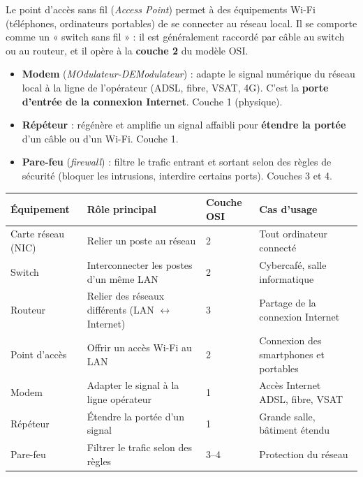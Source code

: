\documentclass[11pt]{article}
\newcommand{\cle}[1]{{\popxbold\color{popdark}#1}}
\begin{document}
\begin{definition}
Le \cle{point d'accès sans fil} (\emph{Access Point}) permet à des équipements Wi-Fi (téléphones, ordinateurs portables) de se connecter au réseau local. Il se comporte comme un « switch sans fil » : il est généralement raccordé par câble au switch ou au routeur, et il opère à la \textbf{couche 2} du modèle OSI.
\end{definition}

\begin{propriete}
\begin{itemize}
  \item \textbf{Modem} (\emph{MOdulateur-DEModulateur}) : adapte le signal numérique du réseau local à la ligne de l'opérateur (ADSL, fibre, VSAT, 4G). C'est la \textbf{porte d'entrée de la connexion Internet}. Couche 1 (physique).
  \item \textbf{Répéteur} : régénère et amplifie un signal affaibli pour \textbf{étendre la portée} d'un câble ou d'un Wi-Fi. Couche 1.
  \item \textbf{Pare-feu} (\emph{firewall}) : filtre le trafic entrant et sortant selon des règles de sécurité (bloquer les intrusions, interdire certains ports). Couches 3 et 4.
\end{itemize}
\end{propriete}

\begin{center}
\begin{tabularx}{\linewidth}{|l|X|l|X|}
\hline
\rowcolor{popblueL} \textbf{Équipement} & \textbf{Rôle principal} & \textbf{Couche OSI} & \textbf{Cas d'usage} \\
\hline
Carte réseau (NIC) & Relier un poste au réseau & 2 & Tout ordinateur connecté \\
\hline
Switch & Interconnecter les postes d'un même LAN & 2 & Cybercafé, salle informatique \\
\hline
Routeur & Relier des réseaux différents (LAN $\leftrightarrow$ Internet) & 3 & Partage de la connexion Internet \\
\hline
Point d'accès & Offrir un accès Wi-Fi au LAN & 2 & Connexion des smartphones et portables \\
\hline
Modem & Adapter le signal à la ligne opérateur & 1 & Accès Internet ADSL, fibre, VSAT \\
\hline
Répéteur & Étendre la portée d'un signal & 1 & Grande salle, bâtiment étendu \\
\hline
Pare-feu & Filtrer le trafic selon des règles & 3--4 & Protection du réseau \\
\hline
\end{tabularx}
\end{center}
\end{document}
